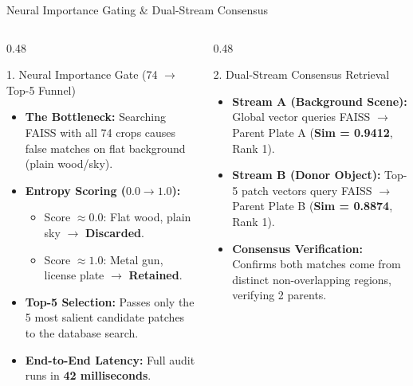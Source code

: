 \documentclass[aspectratio=169,xcolor=table,10pt]{beamer}
\begin{document}
\begin{frame}{Neural Importance Gating \& Dual-Stream Consensus}
  \begin{columns}[T]
    \begin{column}{0.48\textwidth}
      \begin{block}{1. Neural Importance Gate (74 $\to$ Top-5 Funnel)}
        \scriptsize
        \begin{itemize}
          \item \textbf{The Bottleneck:} Searching FAISS with all 74 crops causes false matches on flat background (plain wood/sky).
          \item \textbf{Entropy Scoring ($0.0 \to 1.0$):}
            \begin{itemize}
              \scriptsize
              \item Score $\approx 0.0$: Flat wood, plain sky $\to$ \textbf{Discarded}.
              \item Score $\approx 1.0$: Metal gun, license plate $\to$ \textbf{Retained}.
            \end{itemize}
          \item \textbf{Top-5 Selection:} Passes only the 5 most salient candidate patches to the database search.
          \item \textbf{End-to-End Latency:} Full audit runs in \textbf{42 milliseconds}.
        \end{itemize}
      \end{block}
    \end{column}

    \begin{column}{0.48\textwidth}
      \begin{exampleblock}{2. Dual-Stream Consensus Retrieval}
        \scriptsize
        \begin{itemize}
          \item \textbf{Stream A (Background Scene):} Global vector queries FAISS $\to$ Parent Plate A (\textbf{Sim = 0.9412}, Rank 1).
          \item \textbf{Stream B (Donor Object):} Top-5 patch vectors query FAISS $\to$ Parent Plate B (\textbf{Sim = 0.8874}, Rank 1).
          \item \textbf{Consensus Verification:} Confirms both matches come from distinct non-overlapping regions, verifying 2 parents.
        \end{itemize}
      \end{exampleblock}
    \end{column}
  \end{columns}
\end{frame}
\end{document}
